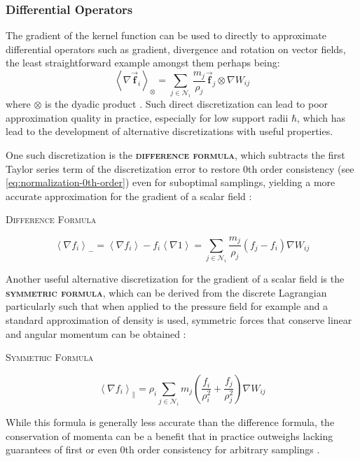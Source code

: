 \documentclass[oneside, a4paper]{book}
\newcommand\emphasis[1]{{\scshape\bfseries#1}}
\newcommand{\equationnamed}[2]{%
  \setlength{\fboxsep}{2pt} %
  \setlength{\fboxrule}{0.01pt}
  \begin{center}
    \begin{minipage}{\textwidth}
      \begin{center}\textsc{#1}\end{center}
      #2
    \end{minipage}
  \end{center}
}
\newcommand\angled[1]{\left\langle#1\right\rangle}
\newcommand\vek[1]{\vec{\bm{#1}}}
\newcommand\br[1]{\left(#1\right)}
\begin{document}
    \subsubsection{Differential Operators}
    The gradient of the kernel function can be used to directly to approximate differential operators such as gradient, divergence and rotation on vector fields, the least straightforward example amongst them perhaps being:
    \begin{equation}\label{eq:dyadic-product-sph-sum}
      \angled{\nabla \vek{f}_i}_\otimes = \sum_{j\in\mathcal{N}_i} \frac{m_j}{\rho_j} \vek{f}_j \otimes \nabla W_{ij}
    \end{equation}
    where $\otimes$ is the dyadic product \autocite{tutorial2019}. Such direct discretization can lead to poor approximation quality in practice, especially for low support radii $\hbar$, which has lead to the development of alternative discretizations with useful properties.

    One such discretization is the \emphasis{difference formula}, which subtracts the first Taylor series term of the discretization error to restore 0th order consistency (see \autoref{eq:normalization-0th-order}) even for suboptimal samplings, yielding a more accurate approximation for the gradient of a scalar field \autocites{tutorial2019}{price-2012}:
    \equationnamed{Difference Formula}{\begin{equation}\label{eq:sph-difference}
      \angled{\nabla f_i}_- = \angled{\nabla f_i} - f_i\angled{\nabla 1} = \sum_{j\in\mathcal{N}_i} \frac{m_j}{\rho_j} \br{f_j - f_i} \nabla W_{ij}
    \end{equation}}

    Another useful alternative discretization for the gradient of a scalar field is the \emphasis{symmetric formula}, which can be derived from the discrete Lagrangian particularly such that when applied to the pressure field for example and a standard approximation of density is used, symmetric forces that conserve linear and angular momentum can be obtained \autocites{tutorial2019}{price-2012}:
    \equationnamed{Symmetric Formula}{
      \begin{equation}\label{eq:sph-symmetric}
        \angled{\nabla f_i}_\parallel = \rho_i\sum_{j\in\mathcal{N}_i} m_j \br{\frac{f_i}{\rho_i^2} + \frac{f_j}{\rho_j^2}} \nabla W_{ij}
      \end{equation}
    }
    While this formula is generally less accurate than the difference formula, the conservation of momenta can be a benefit that in practice outweighs lacking guarantees of first or even 0th order consistency for arbitrary samplings \autocite{tutorial2019}.
\end{document}
